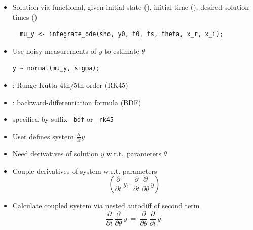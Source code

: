 \documentclass[10pt]{report}
\begin{document}
%
\begin{itemize}
\item Solution via functional, given initial state (),
initial time (), desired solution times ()
{\footnotesize
\begin{Verbatim}
  mu_y <- integrate_ode(sho, y0, t0, ts, theta, x_r, x_i);
\end{Verbatim}
}
\item Use noisy measurements of $y$ to estimate $\theta$
\begin{Verbatim}
y ~ normal(mu_y, sigma);
\end{Verbatim}
\end{itemize}


%
\begin{itemize}
\item {}: Runge-Kutta 4th/5th order (RK45)
\item {}:  backward-differentiation formula (BDF)
\item specified by suffix \Verb|_bdf| or \Verb|_rk45|
\end{itemize}


%
\begin{itemize}
\item User defines system $\frac{\partial}{\partial t} y$
\item Need derivatives of solution $y$ w.r.t.\ parameters $\theta$
\item Couple derivatives of system  w.r.t. parameters
\[
\left(
\frac{\partial}{\partial t} \, y, \ \
\frac{\partial}{\partial t} \, \frac{\partial}{\partial \theta} \, y
\right)
\]
\item Calculate coupled system via nested autodiff of second term
\[
\frac{\partial}{\partial t} \, \frac{\partial}{\partial \theta} \, y
\ = \
\frac{\partial}{\partial \theta} \, \frac{\partial}{\partial t} \, y.
\]
\end{itemize}
\end{document}

